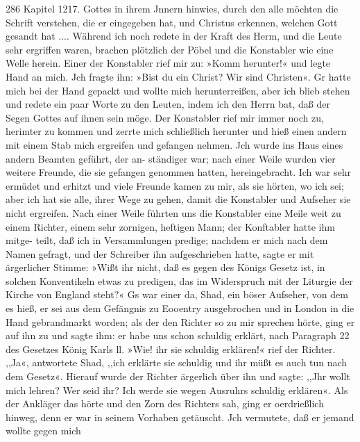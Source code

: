 286 Kapitel 1217.
Gottes in ihrem Jnnern hinwies, durch den alle möchten die
Schrift verstehen, die er eingegeben hat, und Christus erkennen,
welchen Gott gesandt hat .... Während ich noch redete in der
Kraft des Herm, und die Leute sehr ergriffen waren, brachen
plötzlich der Pöbel und die Konstabler wie eine Welle herein.
Einer der Konstabler rief mir zu: »Komm herunter!« und legte
Hand an mich. Jch fragte ihn: »Bist du ein Christ? Wir sind
Christen«. Gr hatte mich bei der Hand gepackt und wollte mich
herunterreißen, aber ich blieb stehen und redete ein paar Worte
zu den Leuten, indem ich den Herrn bat, daß der Segen Gottes
auf ihnen sein möge. Der Konstabler rief mir immer noch zu,
herimter zu kommen und zerrte mich schließlich herunter und hieß
einen andern mit einem Stab mich ergreifen und gefangen nehmen.
Jch wurde ins Haus eines andern Beamten geführt, der an-
ständiger war; nach einer Weile wurden vier weitere Freunde,
die sie gefangen genommen hatten, hereingebracht. Ich war sehr
ermüdet und erhitzt und viele Freunde kamen zu mir, als sie
hörten, wo ich sei; aber ich hat sie alle, ihrer Wege zu gehen,
damit die Konstabler und Aufseher sie nicht ergreifen. Nach einer
Weile führten uns die Konstabler eine Meile weit zu einem Richter,
einem sehr zornigen, heftigen Mann; der Konftabler hatte ihm mitge-
teilt, daß ich in Versammlungen predige; nachdem er mich nach dem
Namen gefragt, und der Schreiber ihn aufgeschrieben hatte, sagte er
mit ärgerlicher Stimme: »Wißt ihr nicht, daß es gegen des Königs
Gesetz ist, in solchen Konventikeln etwas zu predigen, das im
Widerspruch mit der Liturgie der Kirche von England steht?«
Gs war einer da, Shad, ein böser Aufseher, von dem es hieß,
er sei aus dem Gefängnis zu Eooentry ausgebrochen und in
London in die Hand gebrandmarkt worden; als der den Richter
so zu mir sprechen hörte, ging er auf ihn zu und sagte ihm: er
habe uns schon schuldig erklärt, nach Paragraph 22 des Gesetzes
König Karls ll. »Wie! ihr sie schuldig erklären!« rief der
Richter. ,,Ja«, antwortete Shad, ,,ich erklärte sie schuldig
und ihr müßt es auch tun nach dem Gesetz«. Hierauf wurde
der Richter ärgerlich über ihn und sagte: ,,Jhr wollt mich lehren?
Wer seid ihr? Ich werde sie wegen Ausruhrs schuldig erklären«.
Als der Ankläger das hörte und den Zorn des Richters sah,
ging er oerdrießlich hinweg, denn er war in seinem Vorhaben
getäuscht. Jch vermutete, daß er jemand wollte gegen mich


